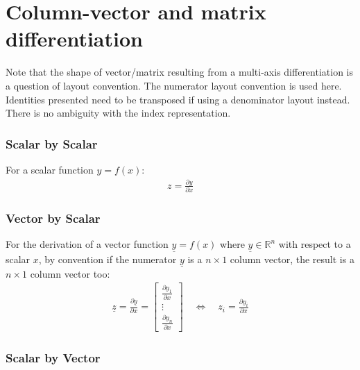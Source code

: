 \section{Column-vector and matrix differentiation}
\label{sec:vecmatdifferentiation}

Note that the shape of vector/matrix resulting from a multi-axis differentiation is a question of layout convention. The numerator layout convention is used here. Identities presented need to be transposed if using a denominator layout instead. There is no ambiguity with the index representation.

\subsubsection{Scalar by Scalar}

For a scalar function $y = f(x)$:
\begin{align}
 z = \frac{\partial y}{\partial x}
\end{align}


\subsubsection{Vector by Scalar}

For the derivation of a vector function $\underline{y} = f(x)$ where $\underline{y} \in \mathbb{R}^n$ with respect to a scalar $x$, by convention if the numerator $\underline{y}$ is a $n \times 1$ column vector, the result is a $n \times 1$ column vector too:
\begin{align}
 \underline{z} = \frac{\partial \underline{y}}{\partial x} =
 \left[ \begin{array}{c }
         \frac{\partial y_1}{\partial x}   \\ \vdots \\ \frac{\partial y_n}{\partial x}
 \end{array} \right]
 \quad\Leftrightarrow\quad
 z_{i} = \frac{\partial y_i}{\partial x}
\end{align}


\subsubsection{Scalar by Vector}

